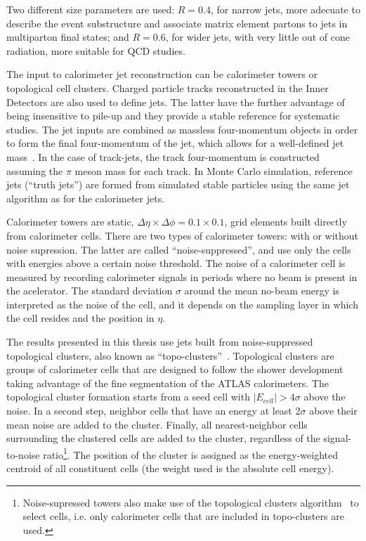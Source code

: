  Two different size parameters are used: $R = 0.4$, for narrow jets, more adecuate to describe the event substructure and associate matrix element partons to jets in multiparton final states; %
and $R = 0.6$, for wider jets, with very little out of cone radiation, more suitable for QCD studies.

The input to calorimeter jet reconstruction can be calorimeter towers or topological cell clusters. Charged particle tracks reconstructed in the Inner Detectors are also used to define jets. The latter have the further advantage of being insensitive to pile-up and they provide a stable reference for systematic studies. The jet inputs are combined as massless four-momentum objects in order to form the final four-momentum of the jet, which allows for a well-defined jet mass~\cite{Busato:1271710}. In the case of track-jets, the track four-momentum is constructed assuming the $\pi$ meson mass for each track.  In Monte Carlo simulation, reference jets (``truth jets'') are formed from simulated stable particles using the same jet algorithm as for the calorimeter jets. 


Calorimeter towers are static, $\Delta \eta \times \Delta \phi = 0.1 \times 0.1$, grid elements built directly from calorimeter cells. There are two types of calorimeter towers: with or without noise supression. The latter are called ``noise-suppressed'', %
and use only the cells with energies above a certain noise threshold.  The noise of a calorimeter cell is measured by recording calorimeter signals in periods where no beam is present in the acelerator.  The standard deviation $\sigma$ around the mean %
no-beam energy is interpreted as the noise of the cell, and it depends on the sampling layer in which the cell resides and the position in $\eta$.

The results presented in this thesis use jets built from noise-suppressed topological clusters,  %
also known as ``topo-clusters''~\cite{topoClusters}. Topological clusters are groups of calorimeter cells that are designed to follow the shower development taking advantage of the fine segmentation of the ATLAS calorimeters. The topological cluster formation starts from a seed cell with $|E_{cell}| > 4 \sigma$ above the noise. In a second step, neighbor cells that have an energy at least 2$\sigma$ above their mean noise are added to the cluster. Finally, all nearest-neighbor cells surrounding the clustered cells are added to the cluster, regardless of the signal-to-noise ratio\footnote{Noise-supressed towers also make use of the topological clusters algorithm~\cite{topoClusters} to select cells, i.e. only calorimeter cells that are included in topo-clusters are used.}. The position of the cluster is assigned as the energy-weighted centroid of all constituent cells (the weight used is the absolute cell energy).


